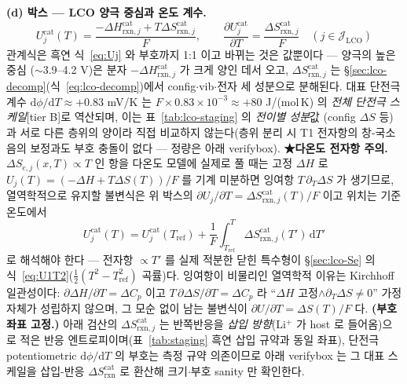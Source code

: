 \documentclass[11pt,a4paper]{article}
\newcommand{\dd}{\mathrm{d}}
\newcommand{\rxn}{\mathrm{rxn}}
\begin{document}
\textbf{(d) 박스 — LCO 양극 중심과 온도 계수.}
\begin{equation}
\boxed{\;
U_j^\mathrm{cat}(T)=\frac{-\Delta H_{\rxn,j}^\mathrm{cat}+T\Delta S_{\rxn,j}^\mathrm{cat}}{F},
\qquad
\frac{\partial U_j^\mathrm{cat}}{\partial T}=\frac{\Delta S_{\rxn,j}^\mathrm{cat}}{F}
\quad(j\in\mathcal J_\mathrm{LCO})\;}
\label{eq:lco-dUdT}
\end{equation}
관계식은 흑연 식~\eqref{eq:Uj} 와 부호까지 1:1 이고 바뀌는 것은 값뿐이다 — 양극의 높은 중심
($\sim$3.9--4.2 V)은 분자 $-\Delta H_{\rxn,j}^\mathrm{cat}$ 가 크게 양인 데서 오고, $\Delta S_{\rxn,j}^\mathrm{cat}$
는 \S\ref{sec:lco-decomp}(식~\eqref{eq:lco-decomp})에서 config$\cdot$vib$\cdot$전자 세 성분으로 분해된다.
대표 단전극 계수 $\dd\phi/\dd T\approx+0.83$ mV/K 는 $F\times0.83\times10^{-3}\approx+80$ J/(mol\,K) 의
\emph{전체 단전극 스케일}[tier B]로 역산되며, 이는 표~\ref{tab:lco-staging} 의 \emph{전이별 성분}값
(config $\Delta S$ 등)과 서로 다른 층위의 양이라 직접 비교하지 않는다(층위 분리 시 T1 전자항의 창-국소 음의
보정과도 부호 충돌이 없다 — 정량은 아래 verifybox). \textbf{★다온도 전자항 주의.} $\Delta S_{e,j}(x,T)\propto T$
인 항을 다온도 모델에 실제로 풀 때는 고정 $\Delta H$ 로 $U_j(T)=(-\Delta H+T\Delta S(T))/F$ 를 기계 미분하면
잉여항 $T\,\partial_T\Delta S$ 가 생기므로, 열역학적으로 유지할 불변식은 위 박스의
$\partial U_j/\partial T=\Delta S_{\rxn,j}^\mathrm{cat}(T)/F$ 이고 위치는 기준온도에서
\[
U_j^\mathrm{cat}(T)=U_j^\mathrm{cat}(T_\mathrm{ref})+\frac1F\int_{T_\mathrm{ref}}^{T}\Delta S_{\rxn,j}^\mathrm{cat}(T')\,\dd T'
\]
로 해석해야 한다 — 전자항 $\propto T'$ 를 실제 적분한 닫힌 특수형이 \S\ref{sec:lco-Se} 의
식~\eqref{eq:U1T2}($\tfrac12(T^2-T_\mathrm{ref}^2)$ 곡률)다. 잉여항이 비물리인 열역학적 이유는 Kirchhoff
일관성이다: $\partial\Delta H/\partial T=\Delta C_p$ 이고 $T\,\partial\Delta S/\partial T=\Delta C_p$ 라
``$\Delta H$ 고정$\wedge\partial_T\Delta S\ne0$'' 가정 자체가 성립하지 않으며, 그 모순 없이 남는 불변식이
$\partial U/\partial T=\Delta S(T)/F$ 다. \textbf{(부호 좌표 고정.)} 아래 검산의 $\Delta S_{\rxn,j}^\mathrm{cat}$ 는 반쪽반응을
\emph{삽입 방향}(Li$^+$ 가 host 로 들어옴)으로 적은 반응 엔트로피이며(표~\ref{tab:staging} 흑연 삽입 규약과
동일 좌표), 단전극 potentiometric $\dd\phi/\dd T$ 의 부호는 측정 규약 의존이므로 아래 verifybox 는 그
대표 스케일을 삽입-반응 $\Delta S_{\rxn}^\mathrm{cat}$ 로 환산해 크기$\cdot$부호 sanity 만 확인한다.
\end{document}
